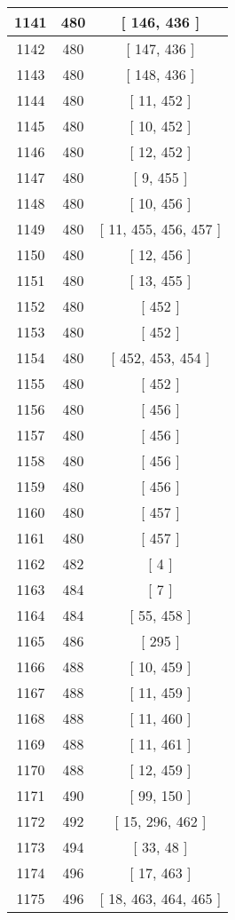 \begin{center}
\begin{longtable}[H]{|| c c c ||}
\\\hline
1141 & 480 & [ 146, 436 ]
\\\hline
1142 & 480 & [ 147, 436 ]
\\\hline
1143 & 480 & [ 148, 436 ]
\\\hline
1144 & 480 & [ 11, 452 ]
\\\hline
1145 & 480 & [ 10, 452 ]
\\\hline
1146 & 480 & [ 12, 452 ]
\\\hline
1147 & 480 & [ 9, 455 ]
\\\hline
1148 & 480 & [ 10, 456 ]
\\\hline
1149 & 480 & [ 11, 455, 456, 457 ]
\\\hline
1150 & 480 & [ 12, 456 ]
\\\hline
1151 & 480 & [ 13, 455 ]
\\\hline
1152 & 480 & [ 452 ]
\\\hline
1153 & 480 & [ 452 ]
\\\hline
1154 & 480 & [ 452, 453, 454 ]
\\\hline
1155 & 480 & [ 452 ]
\\\hline
1156 & 480 & [ 456 ]
\\\hline
1157 & 480 & [ 456 ]
\\\hline
1158 & 480 & [ 456 ]
\\\hline
1159 & 480 & [ 456 ]
\\\hline
1160 & 480 & [ 457 ]
\\\hline
1161 & 480 & [ 457 ]
\\\hline
1162 & 482 & [ 4 ]
\\\hline
1163 & 484 & [ 7 ]
\\\hline
1164 & 484 & [ 55, 458 ]
\\\hline
1165 & 486 & [ 295 ]
\\\hline
1166 & 488 & [ 10, 459 ]
\\\hline
1167 & 488 & [ 11, 459 ]
\\\hline
1168 & 488 & [ 11, 460 ]
\\\hline
1169 & 488 & [ 11, 461 ]
\\\hline
1170 & 488 & [ 12, 459 ]
\\\hline
1171 & 490 & [ 99, 150 ]
\\\hline
1172 & 492 & [ 15, 296, 462 ]
\\\hline
1173 & 494 & [ 33, 48 ]
\\\hline
1174 & 496 & [ 17, 463 ]
\\\hline
1175 & 496 & [ 18, 463, 464, 465 ]
\\\hline

\end{longtable}
\end{center}
